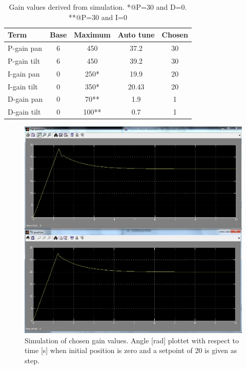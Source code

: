 \begin{table}[htb]				
	\begin{center}
	\begin{tabular}{l|c|c|c|c}			
	Term & Base & Maximum & Auto tune & Chosen \\			
	\hline												
P-gain pan& 6 & 450 & 37.2 & 30\\
P-gain tilt& 6 & 450 & 39.2 & 30\\
I-gain pan& 0 & 250* & 19.9  & 20\\
I-gain tilt& 0 & 350* & 20.43 & 20\\
D-gain pan& 0 & 70** & 1.9 & 1\\
D-gain tilt& 0 & 100** & 0.7 & 1\\
	\end{tabular}
	\end{center}
	\caption{Gain values derived from simulation. *@P=30 and D=0. **@P=30 and I=0}				
	\label{tab:gain_values}			
\end{table}

\begin{figure}[htb]
	\begin{center}
	\includegraphics[width=\textwidth,trim=0 0 0 0]{graphics/screensh_pid.jpg} %
	\caption{Simulation of chosen gain values. Angle [rad] plottet with respect to time [s] when initial position is zero and a setpoint of 20 is given as step.}
	\label{fig:chosen_plot}			%
	\end{center}
\end{figure}

